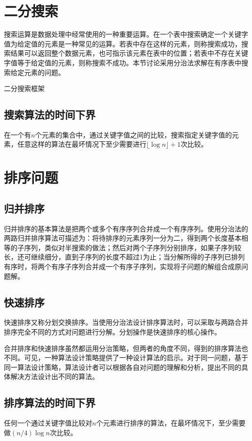 \section{二分搜索}
搜索运算是数据处理中经常使用的一种重要运算。在一个表中搜索确定一个关键字值为给定值的元素是一种常见的运算。若表中存在这样的元素，则称搜索成功，搜索结果可以返回整个数据元素，也可指示该元素在表中的位置；若表中不存在关键字值等于给定值的元素，则称搜索不成功。本节讨论采用分治法求解在有序表中搜索给定元素的问题。

二分搜索框架

\subsection*{搜索算法的时间下界}
在一个有$n$个元素的集合中，通过关键字值之间的比较，搜索指定关键字值的元素，任意这样的算法在最坏情况下至少需要进行$\lfloor \log n\rfloor +1$次比较。
\section{排序问题}
\subsection*{归并排序}
归并排序的基本算法是把两个或多个有序序列合并成一个有序序列。使用分治法的两路归并排序算法可描述为：将待排序的元素序列一分为二，得到两个长度基本相等的子序列，类似对半搜索的做法；然后对两个子序列分别排序，如果子序列较长，还可继续细分，直到子序列的长度不超过1为止；当分解所得的子序列已排列有序时，将两个有序子序列合并成一个有序子序列，实现将子问题的解组合成原问题解。

\subsection*{快速排序}
快速排序又称分划交换排序。当使用分治法设计排序算法时，可以采取与两路合并排序完全不同的方式对问题进行分解。分划操作是快速排序的核心操作。


合并排序和快速排序虽然都运用分治策略，但两者的角度不同，得到的排序算法也不同。可见，一种算法设计策略提供了一种设计算法的启示。对于同一问题，基于同一算法设计策略，算法设计者可以根据各自对问题的理解和分析，提出不同的具体解决方法设计出不同的算法。
\subsection*{排序算法的时间下界}
任何一个通过关键字值比较对$n$个元素进行排序的算法，在最坏情况下，至少需要做$(n/4)\log n$次比较。
